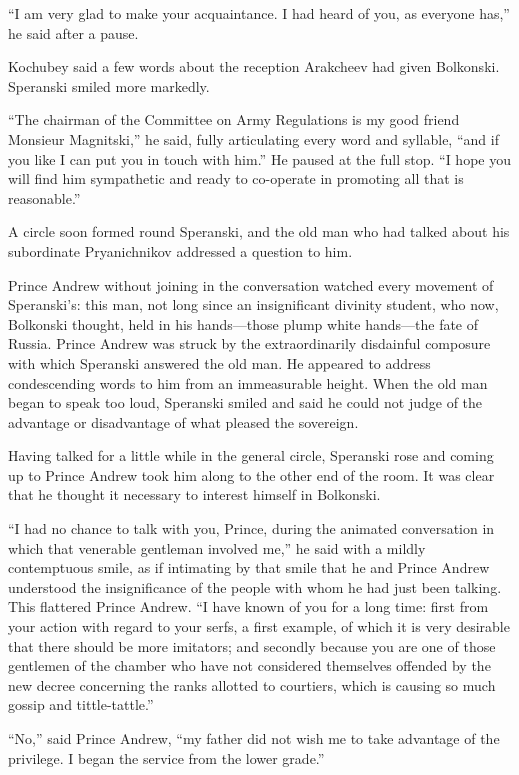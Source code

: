 ``I am very glad to make your acquaintance. I had heard of you,
as everyone has,'' he said after a pause.

Kochubey said a few words about the reception Arakcheev had given
Bolkonski. Speranski smiled more markedly.

``The chairman of the Committee on Army Regulations is my good
friend Monsieur Magnitski,'' he said, fully articulating every
word and syllable, ``and if you like I can put you in touch with
him.'' He paused at the full stop. ``I hope you will find him
sympathetic and ready to co-operate in promoting all that is
reasonable.''

A circle soon formed round Speranski, and the old man who had
talked about his subordinate Pryanichnikov addressed a question
to him.

Prince Andrew without joining in the conversation watched every
movement of Speranski's: this man, not long since an
insignificant divinity student, who now, Bolkonski thought, held
in his hands---those plump white hands---the fate of
Russia. Prince Andrew was struck by the extraordinarily
disdainful composure with which Speranski answered the old
man. He appeared to address condescending words to him from an
immeasurable height. When the old man began to speak too loud,
Speranski smiled and said he could not judge of the advantage or
disadvantage of what pleased the sovereign.

Having talked for a little while in the general circle, Speranski
rose and coming up to Prince Andrew took him along to the other
end of the room. It was clear that he thought it necessary to
interest himself in Bolkonski.

``I had no chance to talk with you, Prince, during the animated
conversation in which that venerable gentleman involved me,'' he
said with a mildly contemptuous smile, as if intimating by that
smile that he and Prince Andrew understood the insignificance of
the people with whom he had just been talking. This flattered
Prince Andrew. ``I have known of you for a long time: first from
your action with regard to your serfs, a first example, of which
it is very desirable that there should be more imitators; and
secondly because you are one of those gentlemen of the chamber
who have not considered themselves offended by the new decree
concerning the ranks allotted to courtiers, which is causing so
much gossip and tittle-tattle.''

``No,'' said Prince Andrew, ``my father did not wish me to take
advantage of the privilege. I began the service from the lower
grade.''

